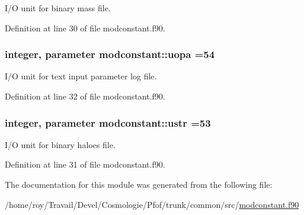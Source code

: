 I/\-O unit for binary mass file. 



Definition at line 30 of file modconstant.\-f90.

\hypertarget{classmodconstant_a545e6e3d5c24f9ce81e3f88999f57b41}{
\subsubsection[{uopa}]{\setlength{\rightskip}{0pt plus 5cm}integer, parameter modconstant\-::uopa =54}}\label{classmodconstant_a545e6e3d5c24f9ce81e3f88999f57b41}


I/\-O unit for text input parameter log file. 



Definition at line 32 of file modconstant.\-f90.

\hypertarget{classmodconstant_a7ad4db4111cceef61b48e40126488f2d}{
\subsubsection[{ustr}]{\setlength{\rightskip}{0pt plus 5cm}integer, parameter modconstant\-::ustr =53}}\label{classmodconstant_a7ad4db4111cceef61b48e40126488f2d}


I/\-O unit for binary haloes file. 



Definition at line 31 of file modconstant.\-f90.



The documentation for this module was generated from the following file\-:\begin{DoxyCompactItemize}
\item 
/home/roy/\-Travail/\-Devel/\-Cosmologie/\-Pfof/trunk/common/src/\hyperlink{modconstant_8f90}{modconstant.\-f90}\end{DoxyCompactItemize}
